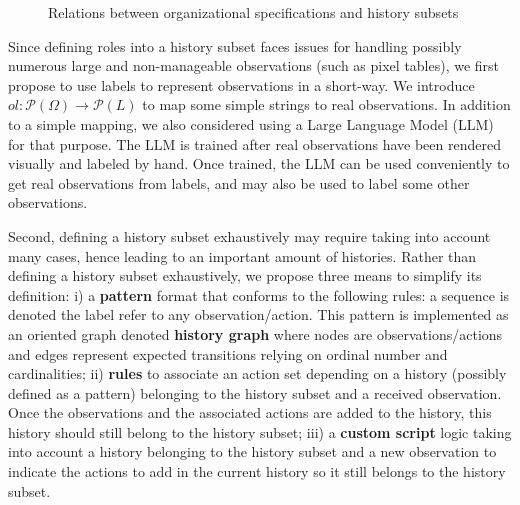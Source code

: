 \documentclass[sigconf,anonymous]{aamas}
\begin{document}
\begin{figure}[h!]
    \centering
    
    \caption{Relations between organizational specifications and history subsets}
    \label{fig:PRAHOM_osm_rels}
\end{figure}

Since defining roles into a history subset faces issues for handling possibly numerous large and non-manageable observations (such as pixel tables), we first propose to use labels to represent observations in a short-way. We introduce $ol: \mathcal{P}(\Omega) \rightarrow \mathcal{P}(L)$ to map some simple strings to real observations. In addition to a simple mapping, we also considered using a Large Language Model (LLM) for that purpose. %
The LLM is trained after real observations have been rendered visually and labeled by hand. Once trained, the LLM can be used conveniently to get real observations from labels, and may also be used to label some other observations.

%     

Second, defining a history subset exhaustively may require taking into account many cases, hence leading to an important amount of histories. %
Rather than defining a history subset exhaustively, we propose three means to simplify its definition:
%
\quad i) a \textbf{pattern} format that conforms to the following rules: a sequence is denoted  the  label refer to any observation/action. This pattern is implemented as an oriented graph denoted \textbf{history graph} where nodes are observations/actions and edges represent expected transitions relying on ordinal number and cardinalities; \quad
%
ii) \textbf{rules} to associate an action set depending on a history (possibly defined as a pattern) belonging to the history subset and a received observation. Once the observations and the associated actions are added to the history, this history should still belong to the history subset; \quad
%
iii) a \textbf{custom script} logic taking into account a history belonging to the history subset and a new observation to indicate the actions to add in the current history so it still belongs to the history subset.
\end{document}
